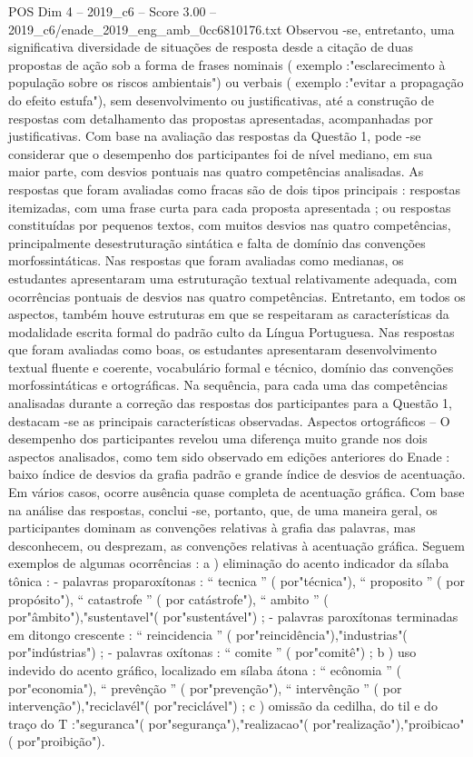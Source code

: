 \begin{textsample}{POS Dim 4 – 2019\_c6 – Score 3.00 – 2019\_c6/enade\_2019\_eng\_amb\_0cc6810176.txt}
Observou -se, entretanto, uma significativa diversidade de situações de resposta desde a citação de duas propostas de ação sob a forma de frases nominais ( exemplo :"esclarecimento à população sobre os riscos ambientais") ou verbais ( exemplo :"evitar a propagação do efeito estufa"), sem desenvolvimento ou justificativas, até a construção de respostas com detalhamento das propostas apresentadas, acompanhadas por justificativas.
Com base na avaliação das respostas da Questão 1, pode -se considerar que o desempenho dos participantes foi de nível mediano, em sua maior parte, com desvios pontuais nas quatro competências analisadas.
As respostas que foram avaliadas como fracas são de dois tipos principais : respostas itemizadas, com uma frase curta para cada proposta apresentada ; ou respostas constituídas por pequenos textos, com muitos desvios nas quatro competências, principalmente desestruturação sintática e falta de domínio das convenções morfossintáticas.
Nas respostas que foram avaliadas como medianas, os estudantes apresentaram uma estruturação textual relativamente adequada, com ocorrências pontuais de desvios nas quatro competências.
Entretanto, em todos os aspectos, também houve estruturas em que se respeitaram as características da modalidade escrita formal do padrão culto da Língua Portuguesa.
Nas respostas que foram avaliadas como boas, os estudantes apresentaram desenvolvimento textual fluente e coerente, vocabulário formal e técnico, domínio das convenções morfossintáticas e ortográficas.
Na sequência, para cada uma das competências analisadas durante a correção das respostas dos participantes para a Questão 1, destacam -se as principais características observadas.
Aspectos ortográficos – O desempenho dos participantes revelou uma diferença muito grande nos dois aspectos analisados, como tem sido observado em edições anteriores do Enade : baixo índice de desvios da grafia padrão e grande índice de desvios de acentuação.
Em vários casos, ocorre ausência quase completa de acentuação gráfica.
Com base na análise das respostas, conclui -se, portanto, que, de uma maneira geral, os participantes dominam as convenções relativas à grafia das palavras, mas desconhecem, ou desprezam, as convenções relativas à acentuação gráfica.
Seguem exemplos de algumas ocorrências : a ) eliminação do acento indicador da sílaba tônica : - palavras proparoxítonas : “ tecnica ” ( por"técnica"), “ proposito ” ( por propósito"), “ catastrofe ” ( por catástrofe"), “ ambito ” ( por"âmbito"),"sustentavel"( por"sustentável") ; - palavras paroxítonas terminadas em ditongo crescente : “ reincidencia ” ( por"reincidência"),"industrias"( por"indústrias") ; - palavras oxítonas : “ comite ” ( por"comitê") ; b ) uso indevido do acento gráfico, localizado em sílaba átona : “ ecônomia ” ( por"economia"), “ prevênção ” ( por"prevenção"), “ intervênção ” ( por intervenção"),"reciclavél"( por"reciclável") ; c ) omissão da cedilha, do til e do traço do T :"seguranca"( por"segurança"),"realizacao"( por"realização"),"proibicao"( por"proibição").

\end{textsample}
